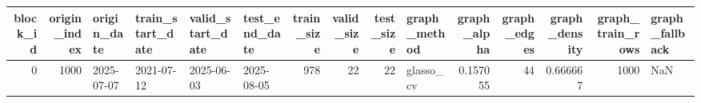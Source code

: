 \begin{tabular}{rrllllrrrlrrrrl}
\toprule
block_id & origin_index & origin_date & train_start_date & valid_start_date & test_end_date & train_size & valid_size & test_size & graph_method & graph_alpha & graph_edges & graph_density & graph_train_rows & graph_fallback \\
\midrule
0 & 1000 & 2025-07-07 & 2021-07-12 & 2025-06-03 & 2025-08-05 & 978 & 22 & 22 & glasso_cv & 0.157055 & 44 & 0.666667 & 1000 & NaN \\
\bottomrule
\end{tabular}

